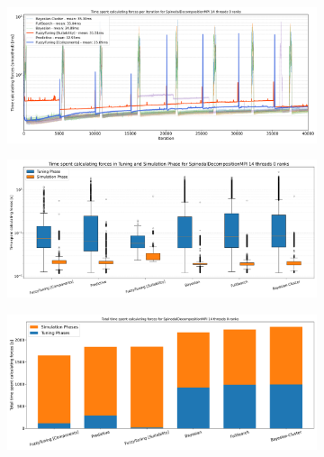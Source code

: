 \begin{figure}[H]
    \centering

    \begin{subfigure}[c]{\textwidth}
        \includegraphics[width=\columnwidth,trim={0cm 0 0cm 0.9cm},clip]{figures/Benchmark/SpinodalDecompositionMPI/SpinodalDecompositionMPI_timings_SpinodalDecompositionMPI_14_0.png}
        \caption{}
        \label{fig:spinodalTimings_14thread}
    \end{subfigure}


    \begin{subfigure}[c]{\textwidth}
        \includegraphics[width=\columnwidth,trim={0cm 0 0cm 1cm},clip]{figures/Benchmark/SpinodalDecompositionMPI/SpinodalDecompositionMPI_timings_boxplot_SpinodalDecompositionMPI_14_0.png}
        \caption{}
        \label{fig:spinodalBoxplot_14thread}
    \end{subfigure}

    \begin{subfigure}[b]{\textwidth}
        \includegraphics[width=\columnwidth,trim={0cm 0 0cm 0.9cm},clip]{figures/Benchmark/SpinodalDecompositionMPI/SpinodalDecompositionMPI_timings_total_SpinodalDecompositionMPI_14_0.png}
        \caption{}
        \label{fig:spinodalTotalTime_14thread}
    \end{subfigure}



\end{figure}
